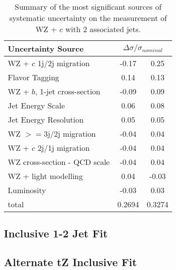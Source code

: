 \begin{table}[H]
  \centering
    \begin{tabular}{l|cc}
        \hline\hline
        Uncertainty Source & \multicolumn{2}{c}{$\Delta \sigma/\sigma_{nominal}$ }  \\
        \hline
        WZ + $c$ 1j/2j migration & -0.17 & 0.25 \\
        Flavor Tagging & 0.14 & 0.13 \\
        WZ + $b$, 1-jet cross-section & -0.09 & 0.09 \\
        Jet Energy Scale & 0.06 & 0.08 \\
        Jet Energy Resolution & 0.05 & 0.05 \\
        WZ $>=$3j/2j migration & -0.04 & 0.04 \\
        WZ + $c$ 2j/1j migration & -0.04 & 0.04 \\
        WZ cross-section - QCD scale & -0.04 & 0.04 \\
        WZ + light modelling & 0.04 & -0.03 \\
        Luminosity & -0.03 & 0.03 \\
        \hline
        total & 0.2694 & 0.3274 \\
        \hline\hline
    \end{tabular}
    \caption{Summary of the most significant sources of systematic uncertainty on the measurement of WZ + $c$ with 2 associated jets.}
    \label{tab:systematics_c2j}
\end{table}

\subsection{Inclusive 1-2 Jet Fit}
\label{sec:incFit}


\subsection{Alternate tZ Inclusive Fit}
\label{sec:inc_tZ}






